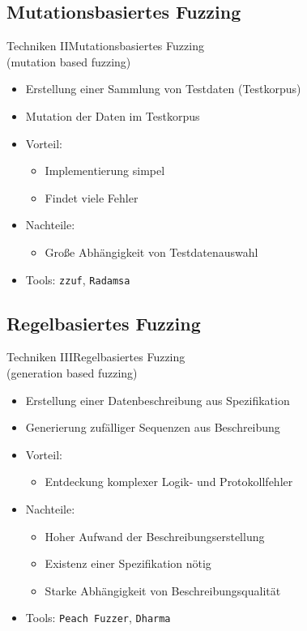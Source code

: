 \documentclass[ngerman,aspectratio=1610,12pt]{beamer}
\begin{document}
\subsection*{Mutationsbasiertes Fuzzing}
\begin{frame}{Techniken II}{Mutationsbasiertes Fuzzing \\{\large(mutation based fuzzing)}}
  \begin{itemize}
    \item Erstellung einer Sammlung von Testdaten (Testkorpus)
    \item Mutation der Daten im Testkorpus
    \item Vorteil:
    \begin{itemize}
      \item Implementierung simpel
      \item Findet viele Fehler
    \end{itemize} 
    \item Nachteile:
    \begin{itemize}
      \item Große Abhängigkeit von Testdatenauswahl
    \end{itemize}
    \item Tools: \texttt{zzuf}, \texttt{Radamsa}
  \end{itemize}
\end{frame}

\subsection*{Regelbasiertes Fuzzing}
\begin{frame}{Techniken III}{Regelbasiertes Fuzzing \\{\large (generation based fuzzing)}}
  \begin{itemize}
    \item Erstellung einer Datenbeschreibung aus Spezifikation %
    \item Generierung zufälliger Sequenzen aus Beschreibung
    \item Vorteil:
    \begin{itemize}
      \item Entdeckung komplexer Logik- und Protokollfehler
    \end{itemize}
    \item Nachteile:
    \begin{itemize}
      \item Hoher Aufwand der Beschreibungserstellung
      \item Existenz einer Spezifikation nötig
      \item Starke Abhängigkeit von Beschreibungsqualität
    \end{itemize} 
    \item Tools: \texttt{Peach Fuzzer}, \texttt{Dharma}
  \end{itemize}
\end{frame}
\end{document}
